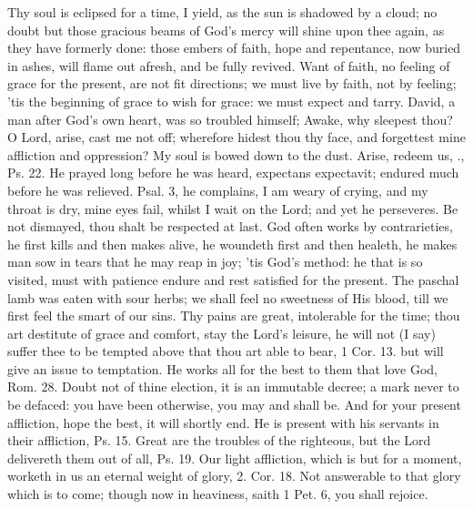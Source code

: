 {Thy soul is eclipsed for a time, I yield, as the sun is shadowed by a
cloud; no doubt but those gracious beams of God's mercy will shine upon
thee again, as they have formerly done: those embers of faith, hope and
repentance, now buried in ashes, will flame out afresh, and be fully
revived. Want of faith, no feeling of grace for the present, are not
fit directions; we must live by faith, not by feeling; 'tis the
beginning of grace to wish for grace: we must expect and tarry. David,
a man after God's own heart, was so troubled himself; Awake, why
sleepest thou? O Lord, arise, cast me not off; wherefore hidest thou
thy face, and forgettest mine affliction and oppression? My soul is
bowed down to the dust. Arise, redeem us, \etc{}., Ps.  22. He prayed
long before he was heard, expectans expectavit; endured much before he
was relieved. Psal.  3, he complains, I am weary of crying, and my
throat is dry, mine eyes fail, whilst I wait on the Lord; and yet he
perseveres. Be not dismayed, thou shalt be respected at last. God often
works by contrarieties, he first kills and then makes alive, he
woundeth first and then healeth, he makes man sow in tears that he may
reap in joy; 'tis God's method: he that is so visited, must with
patience endure and rest satisfied for the present. The paschal lamb
was eaten with sour herbs; we shall feel no sweetness of His blood,
till we first feel the smart of our sins. Thy pains are great,
intolerable for the time; thou art destitute of grace and comfort, stay
the Lord's leisure, he will not (I say) suffer thee to be tempted above
that thou art able to bear, 1 Cor.  13. but will give an issue to
temptation. He works all for the best to them that love God, Rom. 
28. Doubt not of thine election, it is an immutable decree; a mark
never to be defaced: you have been otherwise, you may and shall be. And
for your present affliction, hope the best, it will shortly end. He is
present with his servants in their affliction, Ps.  15. Great are
the troubles of the righteous, but the Lord delivereth them out of all,
Ps.  19. Our light affliction, which is but for a moment, worketh
in us an eternal weight of glory, 2. Cor.  18. Not answerable to
that glory which is to come; though now in heaviness, saith 1 Pet. 
6, you shall rejoice.

}
